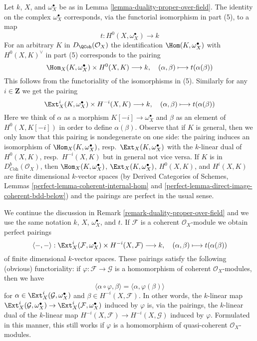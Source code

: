 \begin{remark}
\label{remark-duality-proper-over-field}
Let $k$, $X$, and $\omega_X^\bullet$
be as in Lemma \ref{lemma-duality-proper-over-field}.
The identity on the complex $\omega_X^\bullet$ corresponds, via
the functorial isomorphism in part (5), to a map
$$
t : H^0(X, \omega_X^\bullet) \longrightarrow k
$$
For an arbitrary $K$ in $D_\QCoh(\mathcal{O}_X)$ the identification
$\Hom(K, \omega_X^\bullet)$ with $H^0(X, K)^\vee$ in part (5)
corresponds to the pairing
$$
\Hom_X(K, \omega_X^\bullet) \times H^0(X, K) \longrightarrow k,\quad
(\alpha, \beta) \longmapsto t(\alpha(\beta))
$$
This follows from the functoriality of the isomorphisms in (5). Similarly
for any $i \in \mathbf{Z}$ we get the pairing
$$
\Ext^i_X(K, \omega_X^\bullet) \times H^{-i}(X, K) \longrightarrow k,\quad
(\alpha, \beta) \longmapsto t(\alpha(\beta))
$$
Here we think of $\alpha$ as a morphism $K[-i] \to \omega_X^\bullet$
and $\beta$ as an element of $H^0(X, K[-i])$ in order to define
$\alpha(\beta)$. Observe that if $K$ is general, then we only know
that this pairing is nondegenerate on one side: the pairing induces an
isomorphism of $\Hom_X(K, \omega_X^\bullet)$,
resp.\ $\Ext_X(K, \omega_X^\bullet)$ with the $k$-linear dual of $H^0(X, K)$,
resp.\ $H^{-i}(X, K)$ but in general not vice versa. If $K$
is in $D^b_{\textit{Coh}}(\mathcal{O}_X)$, then
$\Hom_X(K, \omega_X^\bullet)$, $\Ext_X(K, \omega_X^\bullet)$,
$H^0(X, K)$, and $H^i(X, K)$ are finite dimensional $k$-vector spaces (by
Derived Categories of Schemes, Lemmas
\ref{perfect-lemma-coherent-internal-hom} and
\ref{perfect-lemma-direct-image-coherent-bdd-below})
and the pairings are perfect in the usual sense.
\end{remark}

\begin{remark}
\label{remark-coherent-duality-proper-over-field}
We continue the discussion in Remark \ref{remark-duality-proper-over-field}
and we use the same notation $k$, $X$, $\omega_X^\bullet$, and $t$.
If $\mathcal{F}$ is a coherent $\mathcal{O}_X$-module we obtain
perfect pairings
$$
\langle -, - \rangle :
\Ext^i_X(\mathcal{F}, \omega_X^\bullet) \times H^{-i}(X,\mathcal{F})
\longrightarrow k,\quad
(\alpha, \beta) \longmapsto t(\alpha(\beta))
$$
of finite dimensional $k$-vector spaces. These pairings satisfy the
following (obvious) functoriality: if $\varphi : \mathcal{F} \to \mathcal{G}$
is a homomorphism of coherent $\mathcal{O}_X$-modules, then we have
$$
\langle \alpha \circ \varphi, \beta \rangle =
\langle \alpha, \varphi(\beta) \rangle
$$
for $\alpha \in \Ext^i_X(\mathcal{G}, \omega_X^\bullet)$ and
$\beta \in H^{-i}(X, \mathcal{F})$. In other words, the $k$-linear map
$\Ext^i_X(\mathcal{G}, \omega_X^\bullet) \to
\Ext^i_X(\mathcal{F}, \omega_X^\bullet)$ induced by $\varphi$
is, via the pairings, the $k$-linear dual of the $k$-linear map
$H^{-i}(X, \mathcal{F}) \to H^{-i}(X, \mathcal{G})$ induced
by $\varphi$. Formulated in this manner, this still works if
$\varphi$ is a homomorphism of quasi-coherent $\mathcal{O}_X$-modules.
\end{remark}

